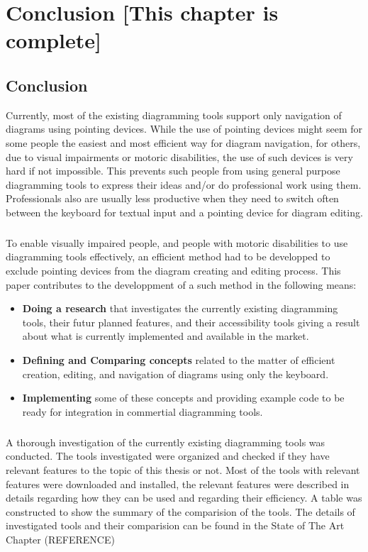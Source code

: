 \chapter{Conclusion [This chapter is complete]}
\beginchapter

\section{Conclusion}
Currently, most of the existing diagramming tools support only navigation of diagrams using pointing devices. While the use of pointing devices might seem for some people the easiest and most efficient way for diagram navigation, for others, due to visual impairments or motoric disabilities, the use of such devices is very hard if not impossible. This prevents such people from using general purpose diagramming tools to express their ideas and/or do professional work using them. Professionals also are usually less productive when they need to switch often between the keyboard for textual input and a pointing device for diagram editing. 

\paragraph{}
To enable visually impaired people, and people with motoric disabilities to use diagramming tools effectively, an efficient method had to be developped to exclude pointing devices from the diagram creating and editing process. This paper contributes to the developpment of a such method in the following means:
\begin{itemize}
\item {\bf Doing a research} that investigates the currently existing diagramming tools, their futur planned features, and their accessibility tools giving a result about what is currently implemented and available in the market.
\item {\bf Defining and Comparing concepts} related to the matter of efficient creation, editing, and navigation of diagrams using only the keyboard.
\item {\bf Implementing} some of these concepts and providing example code to be ready for integration in commertial diagramming tools.
\end{itemize}

\paragraph{}
A thorough investigation of the currently existing diagramming tools was conducted. The tools investigated were organized and checked if they have relevant features to the topic of this thesis or not. Most of the tools with relevant features were downloaded and installed, the relevant features were described in details regarding how they can be used and regarding their efficiency. A table was constructed to show the summary of the comparision of the tools. The details of investigated tools and their comparision can be found in the State of The Art Chapter (REFERENCE)

